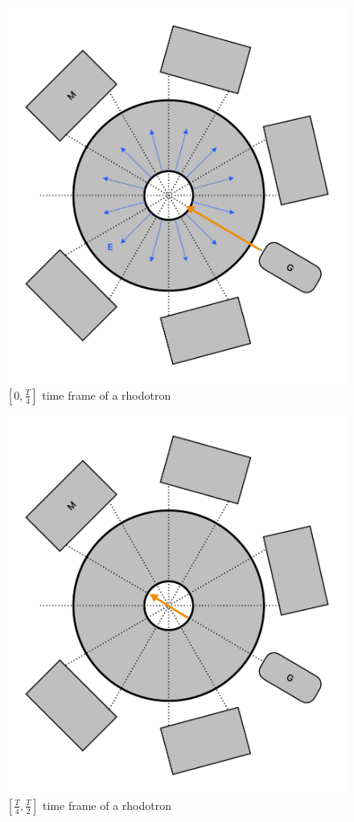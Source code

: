 \documentclass{article}
\begin{document}
\begin{figure}[H]
    \centering
    \includegraphics[width=\textwidth]{../../../figures/illustrations/rhod1.pdf}
    \caption{$[0, \frac{T}{4}]$ time frame of a rhodotron}
    \label{fig:rhod_cycle_1}
\end{figure}
\begin{figure}[H]
    \centering
    \includegraphics[width=\textwidth]{../../../figures/illustrations/rhod2.pdf}
    \caption{$[\frac{T}{4}, \frac{T}{2}]$ time frame of a rhodotron}
    \label{fig:rhod_cycle_2}
\end{figure}
\end{document}
